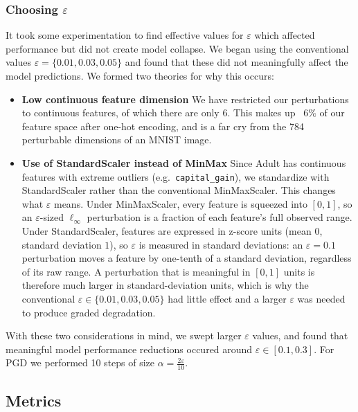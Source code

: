 \documentclass[11pt]{article}
\begin{document}
\subsubsection{Choosing $\varepsilon$}
It took some experimentation to find effective values for $\varepsilon$ which affected performance but did not create model collapse. We began using the conventional values $\varepsilon = \{0.01, 0.03, 0.05\}$ and found that these did not meaningfully affect the model predictions. We formed two theories for why this occurs: 
\begin{itemize}
    \item \textbf{Low continuous feature dimension} \:\: We have restricted our perturbations to continuous features, of which there are only 6. This makes up ~$6\%$ of our feature space after one-hot encoding, and is a far cry from the 784 perturbable dimensions of an MNIST image.
    \item \textbf{Use of StandardScaler instead of MinMax} \:\: Since Adult has continuous features with extreme outliers (e.g.\ \texttt{capital\_gain}), we standardize with StandardScaler rather than the conventional MinMaxScaler. This changes what $\varepsilon$ means. Under MinMaxScaler, every feature is squeezed into $[0,1]$, so an $\varepsilon$-sized $\ell_\infty$ perturbation is a fraction of each feature's full observed range. Under StandardScaler, features are expressed in z-score units (mean $0$, standard deviation $1$), so $\varepsilon$ is measured in standard deviations: an $\varepsilon = 0.1$ perturbation moves a feature by one-tenth of a standard deviation, regardless of its raw range. A perturbation that is meaningful in $[0,1]$ units is therefore much larger in standard-deviation units, which is why the conventional $\varepsilon \in \{0.01, 0.03, 0.05\}$ had little effect and a larger $\varepsilon$ was needed to produce graded degradation. 
\end{itemize}
With these two considerations in mind, we swept larger $\varepsilon$ values, and found that meaningful model performance reductions occured around $\varepsilon \in [0.1, 0.3]$. For PGD we performed 10 steps of size $\alpha=\frac{2\varepsilon}{10}$. 

\subsection{Metrics}
\end{document}
